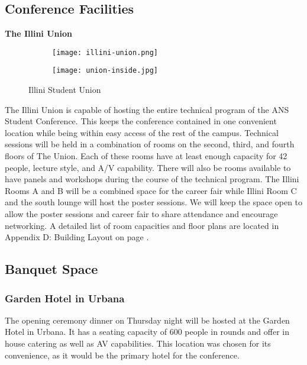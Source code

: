 \subsection{Conference Facilities}

\textbf{The Illini Union}\\

\begin{figure}[H]
	\centering
	\begin{subfigure}{0.5\textwidth}
		\centering
		\texttt{[image: illini-union.png]}
	\end{subfigure}%
	\begin{subfigure}{0.5\textwidth}
		\centering
		\texttt{[image: union-inside.jpg]}
	\end{subfigure}
	\caption{Illini Student Union}		
\end{figure} 


The Illini Union is capable of hosting the entire technical program of the ANS Student Conference. This keeps the conference contained in one convenient location while being within easy access of the rest of the campus. Technical sessions will be held in a combination of rooms on the second, third, and fourth floors of The Union. Each of these rooms have at least enough capacity for 42 people, lecture style, and A/V capability. There will also be rooms available to have panels and workshops during the course of the technical program. The Illini Rooms A and B will be a combined space for the career fair while Illini Room C and the south lounge will host the poster sessions. We will keep the space open to allow the poster sessions and career fair to share attendance and encourage networking. A detailed list of room capacities and floor plans are located in Appendix D: Building Layout on page \pageref{appendix:building}. \\


\subsection{Banquet Space}
\subsubsection{Garden Hotel in Urbana}
The opening ceremony dinner on Thursday night will be hosted at the Garden Hotel in Urbana. It has a seating capacity of 600 people in rounds and offer in house catering as well as AV capabilities. This location was chosen for its convenience, as it would be the primary hotel for the conference. 


